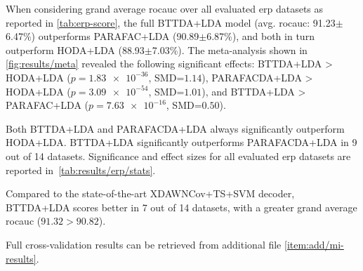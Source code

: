 \documentclass[twocolumn]{article}
\begin{document}
When considering grand average \ac{rocauc} over all evaluated \ac{erp} datasets
as reported in \cref{tab:erp-score},
the full BTTDA+LDA model (avg. \ac{rocauc}: 91.23$\pm$6.47\%) outperforms PARAFAC+LDA
(90.89$\pm$6.87\%),
and both in turn outperform HODA+LDA (88.93$\pm$7.03\%).
The meta-analysis shown in \cref{fig:results/meta} revealed the following
significant effects:
BTTDA+LDA > HODA+LDA ($p=\num{1.83e-36}$, SMD=$1.14$),
PARAFACDA+LDA > HODA+LDA ($p=\num{3.09e-54}$, SMD=$1.01$), and
BTTDA+LDA > PARAFAC+LDA ($p=\num{7.63e-16}$, SMD=$0.50$).
Both BTTDA+LDA and PARAFACDA+LDA always significantly outperform HODA+LDA.
BTTDA+LDA significantly outperforms PARAFACDA+LDA in 9 out of 14 datasets.
Significance and effect sizes for all evaluated \ac{erp} datasets are reported in~\cref{tab:results/erp/stats}.

\begin{sidewaystable*}
	\footnotesize
	
	\caption{Area under the receiver operating characteristic curve for
		cross-validated within-session evaluation of HODA+LDA and our proposed decoders
		PARAFACDA+DLA and BTTDA+LDA evaluated on \ac{erp} datasets.
		Scores for other decoders were taken from \textcite{Chevallier2024}.
		BTTDA+LDA always outperforms HODA+LDA and PARAFACDA+LDA, except for datasets,
		and consistently is nearly on par with or outperforms
		the state-of-the-art XDAwnCov+TS+SVM decoder.
	}
	\label{tab:results/erp/score}
\end{sidewaystable*}
Compared to the state-of-the-art XDAWNCov+TS+SVM decoder, BTTDA+LDA scores
better in 7 out of 14 datasets, with a greater grand average \ac{rocauc}
($91.32 > 90.82$).

Full cross-validation results can be retrieved from additional file \cref{item:add/mi-results}.
\end{document}
